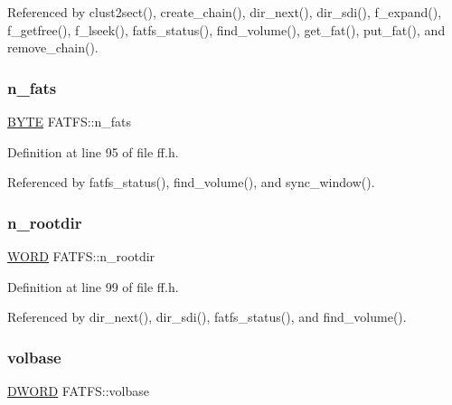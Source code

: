 Referenced by clust2sect(), create\+\_\+chain(), dir\+\_\+next(), dir\+\_\+sdi(), f\+\_\+expand(), f\+\_\+getfree(), f\+\_\+lseek(), fatfs\+\_\+status(), find\+\_\+volume(), get\+\_\+fat(), put\+\_\+fat(), and remove\+\_\+chain().

\mbox{\label{structFATFS_a56716c7e7ac10cf46e73ffb2a2e9b545}} 
\subsubsection{\texorpdfstring{n\+\_\+fats}{n\_fats}}
{\footnotesize\ttfamily \hyperlink{integer_8h_a4ae1dab0fb4b072a66584546209e7d58}{B\+Y\+TE} F\+A\+T\+F\+S\+::n\+\_\+fats}



Definition at line 95 of file ff.\+h.



Referenced by fatfs\+\_\+status(), find\+\_\+volume(), and sync\+\_\+window().

\mbox{\label{structFATFS_a189a00aa038044ffad0fc7f7dcf2aae1}} 
\subsubsection{\texorpdfstring{n\+\_\+rootdir}{n\_rootdir}}
{\footnotesize\ttfamily \hyperlink{integer_8h_a197942eefa7db30960ae396d68339b97}{W\+O\+RD} F\+A\+T\+F\+S\+::n\+\_\+rootdir}



Definition at line 99 of file ff.\+h.



Referenced by dir\+\_\+next(), dir\+\_\+sdi(), fatfs\+\_\+status(), and find\+\_\+volume().

\mbox{\label{structFATFS_a8f0ca578755749d204f59dc83f1a7649}} 
\subsubsection{\texorpdfstring{volbase}{volbase}}
{\footnotesize\ttfamily \hyperlink{integer_8h_ad342ac907eb044443153a22f964bf0af}{D\+W\+O\+RD} F\+A\+T\+F\+S\+::volbase}



